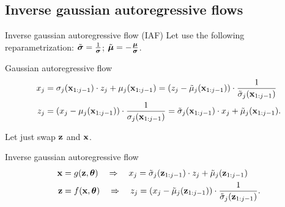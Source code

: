 \subsection{Inverse gaussian autoregressive flows}
\begin{frame}{Inverse gaussian autoregressive flow (IAF)}
	Let use the following reparametrization:
	$\tilde{\boldsymbol{\sigma}} = \frac{1}{\boldsymbol{\sigma}}$; $ \tilde{\boldsymbol{\mu}} = - \frac{\boldsymbol{\mu}}{\boldsymbol{\sigma}}$.
	
	\begin{block}{Gaussian autoregressive flow}
		\vspace{-0.5cm}
		\begin{align*}
			x_j &= \sigma_j (\mathbf{x}_{1:j-1}) \cdot z_j + \mu_j(\mathbf{x}_{1:j-1}) =  \left( z_j - \tilde{\mu}_j(\mathbf{x}_{1:j-1})\right) \cdot \frac{1}{\tilde{\sigma}_j (\mathbf{x}_{1:j-1}) }\\
			z_j &= \left(x_j - \mu_j(\mathbf{x}_{1:j-1}) \right) \cdot \frac{1}{ \sigma_j (\mathbf{x}_{1:j-1})} = \tilde{\sigma}_j (\mathbf{x}_{1:j-1}) \cdot x_j + \tilde{\mu}_j(\mathbf{x}_{1:j-1}).
		\end{align*}
		\vspace{-0.3cm}
	\end{block}
	Let just swap $\mathbf{z}$ and $\mathbf{x}$. 
	
	\begin{block}{Inverse gaussian autoregressive flow}
		\vspace{-0.5cm}
		\begin{align*}
			\mathbf{x} &= g(\mathbf{z}, \boldsymbol{\theta}) \quad \Rightarrow \quad x_j = \tilde{\sigma}_j (\mathbf{z}_{1:j-1}) \cdot z_j + \tilde{\mu}_j(\mathbf{z}_{1:j-1}) \\
			\mathbf{z} &= f(\mathbf{x}, \boldsymbol{\theta}) \quad \Rightarrow \quad z_j = \left( x_j - \tilde{\mu}_j(\mathbf{z}_{1:j-1})\right) \cdot \frac{1}{\tilde{\sigma}_j (\mathbf{z}_{1:j-1}) }.
		\end{align*}
		\vspace{-0.3cm}
	\end{block}
	
\end{frame}
